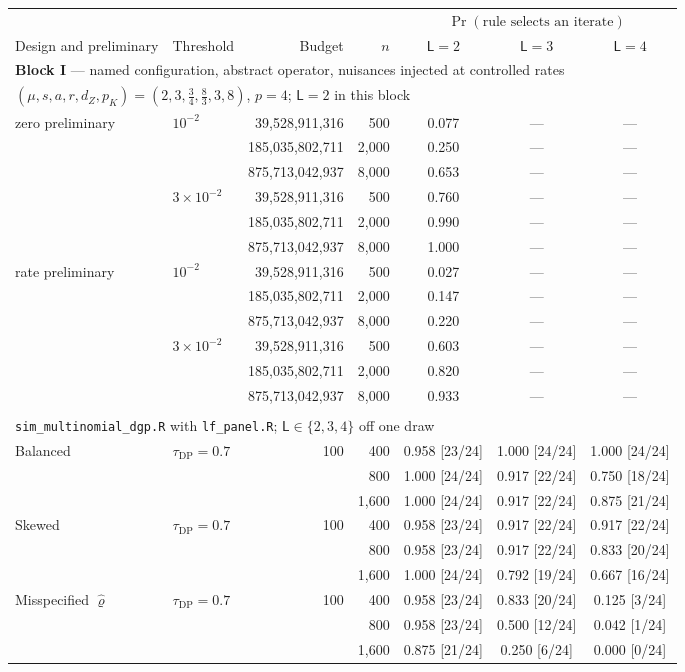 \begin{tabular}{llrrccc}
\toprule
& & & & \multicolumn{3}{c}{$\Pr(\text{rule selects an iterate})$} \\
\cmidrule(lr){5-7}
Design and preliminary & Threshold & Budget & $n$ & $\mathsf L=2$ & $\mathsf L=3$ & $\mathsf L=4$ \\
\midrule
\multicolumn{7}{l}{\textbf{Block I} --- named configuration, abstract operator, nuisances injected at controlled rates} \\
\multicolumn{7}{l}{\quad $(\mu,s,a,r,d_Z,p_K)=(2,3,\tfrac34,\tfrac83,3,8)$, $p=4$; $\mathsf L=2$ in this block} \\
\midrule
zero preliminary & $10^{-2}$ & 39,528,911,316 & 500 & 0.077 & --- & --- \\
 &  & 185,035,802,711 & 2,000 & 0.250 & --- & --- \\
 &  & 875,713,042,937 & 8,000 & 0.653 & --- & --- \\
 & $3\times10^{-2}$ & 39,528,911,316 & 500 & 0.760 & --- & --- \\
 &  & 185,035,802,711 & 2,000 & 0.990 & --- & --- \\
 &  & 875,713,042,937 & 8,000 & 1.000 & --- & --- \\
\addlinespace
rate preliminary & $10^{-2}$ & 39,528,911,316 & 500 & 0.027 & --- & --- \\
 &  & 185,035,802,711 & 2,000 & 0.147 & --- & --- \\
 &  & 875,713,042,937 & 8,000 & 0.220 & --- & --- \\
 & $3\times10^{-2}$ & 39,528,911,316 & 500 & 0.603 & --- & --- \\
 &  & 185,035,802,711 & 2,000 & 0.820 & --- & --- \\
 &  & 875,713,042,937 & 8,000 & 0.933 & --- & --- \\
\addlinespace
\multicolumn{7}{l}{\textbf{Block III} --- multinomial design, shipped engine, nuisances estimated} \\
\multicolumn{7}{l}{\quad \texttt{sim\_multinomial\_dgp.R} with \texttt{lf\_panel.R}; $\mathsf L\in\{2,3,4\}$ off one draw} \\
\midrule
Balanced & $\tau_{\mathrm{DP}}=0.7$ & 100 & 400 & 0.958 [23/24] & 1.000 [24/24] & 1.000 [24/24] \\
 &  &  & 800 & 1.000 [24/24] & 0.917 [22/24] & 0.750 [18/24] \\
 &  &  & 1,600 & 1.000 [24/24] & 0.917 [22/24] & 0.875 [21/24] \\
\addlinespace
Skewed & $\tau_{\mathrm{DP}}=0.7$ & 100 & 400 & 0.958 [23/24] & 0.917 [22/24] & 0.917 [22/24] \\
 &  &  & 800 & 0.958 [23/24] & 0.917 [22/24] & 0.833 [20/24] \\
 &  &  & 1,600 & 1.000 [24/24] & 0.792 [19/24] & 0.667 [16/24] \\
\addlinespace
Misspecified $\hat\varrho$ & $\tau_{\mathrm{DP}}=0.7$ & 100 & 400 & 0.958 [23/24] & 0.833 [20/24] & 0.125 [3/24] \\
 &  &  & 800 & 0.958 [23/24] & 0.500 [12/24] & 0.042 [1/24] \\
 &  &  & 1,600 & 0.875 [21/24] & 0.250 [6/24] & 0.000 [0/24] \\
\bottomrule
\end{tabular}
